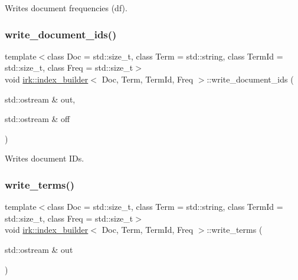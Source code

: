 Writes document frequencies (df). 

\mbox{\label{classirk_1_1index__builder_adcb91466aff37e3fe77b400bffdadfbe}} 
\subsubsection{\texorpdfstring{write\+\_\+document\+\_\+ids()}{write\_document\_ids()}}
{\footnotesize\ttfamily template$<$class Doc  = std\+::size\+\_\+t, class Term  = std\+::string, class Term\+Id  = std\+::size\+\_\+t, class Freq  = std\+::size\+\_\+t$>$ \\
void \mbox{\hyperlink{classirk_1_1index__builder}{irk\+::index\+\_\+builder}}$<$ Doc, Term, Term\+Id, Freq $>$\+::write\+\_\+document\+\_\+ids (\begin{DoxyParamCaption}\item[{std\+::ostream \&}]{out,  }\item[{std\+::ostream \&}]{off }\end{DoxyParamCaption})\hspace{0.3cm}{\ttfamily [inline]}}



Writes document I\+Ds. 

\mbox{\label{classirk_1_1index__builder_a7bd993ab3ceb6527e622187bde86c93a}} 
\subsubsection{\texorpdfstring{write\+\_\+terms()}{write\_terms()}}
{\footnotesize\ttfamily template$<$class Doc  = std\+::size\+\_\+t, class Term  = std\+::string, class Term\+Id  = std\+::size\+\_\+t, class Freq  = std\+::size\+\_\+t$>$ \\
void \mbox{\hyperlink{classirk_1_1index__builder}{irk\+::index\+\_\+builder}}$<$ Doc, Term, Term\+Id, Freq $>$\+::write\+\_\+terms (\begin{DoxyParamCaption}\item[{std\+::ostream \&}]{out }\end{DoxyParamCaption})\hspace{0.3cm}{\ttfamily [inline]}}




